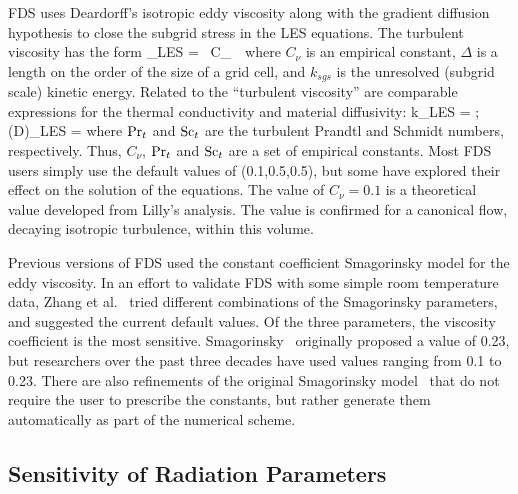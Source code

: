 \documentclass[11pt]{book}
\begin{document}
FDS uses Deardorff's isotropic eddy viscosity along with the gradient diffusion hypothesis to close the subgrid stress in the LES equations.  The turbulent viscosity has the form
\be
  \mu_{\hbox{\tiny LES}} =  \rho \,  C_{\nu}\, \Delta \, 
\ee
where $C_{\nu}$  is an empirical constant, $\Delta$ is a length on the order of the size of a grid cell, and $k_{sgs}$ is the unresolved (subgrid scale) kinetic energy. Related to the ``turbulent  viscosity'' are  comparable expressions  for  the thermal conductivity  and  material diffusivity:
\be
   k_{\hbox{\tiny LES}}  = 
   \quad   ;  \quad  (\rho D)_{\hbox{\tiny  LES}}  =
\ee
where $\hbox{Pr}_t$ and $\hbox{Sc}_t$ are the turbulent Prandtl and Schmidt numbers, respectively. Thus, $C_{\nu}$, $\hbox{Pr}_t$ and $\hbox{Sc}_t$ are a set of empirical constants.  Most FDS users simply use the default values of (0.1,0.5,0.5), but some have explored their effect on the solution of the equations.  The value of $C_{\nu}=0.1$ is a theoretical value developed from Lilly's analysis.  The value is confirmed for a canonical flow, decaying isotropic turbulence, within this volume.

Previous versions of FDS used the constant coefficient Smagorinsky model for the eddy viscosity. In an effort to validate FDS with some simple room temperature data, Zhang et al.~\cite{Zhang:2} tried different combinations of the Smagorinsky parameters, and suggested the current  default values. Of the  three parameters, the viscosity coefficient is the most sensitive.  Smagorinsky~\cite{Smagorinsky:1} originally proposed  a value of 0.23, but researchers over the past  three decades have used values ranging from 0.1 to 0.23. There are also refinements of the original Smagorinsky model~\cite{Germano:1,Lilly:1,Moin:1991} that do not require the user to prescribe the constants, but rather generate them automatically as part of the numerical scheme.

\subsection{Sensitivity of Radiation Parameters}
\end{document}
